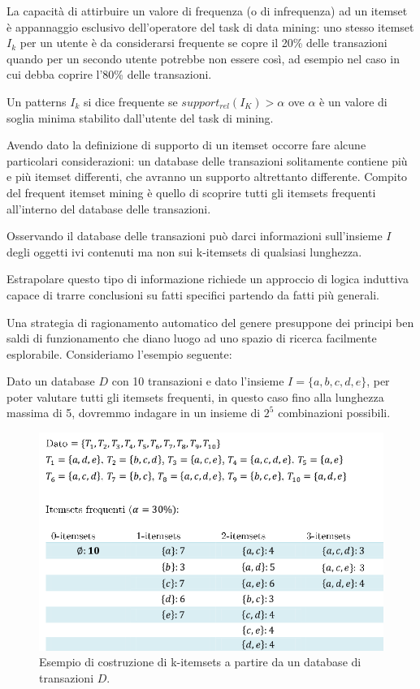 La capacit{\`a} di attirbuire un valore di frequenza (o di infrequenza) ad un itemset {\`e} appannaggio esclusivo dell'operatore del task di data mining: uno stesso itemset \( I_k \) per un utente {\`e} da considerarsi frequente se copre il 20\% delle transazioni quando per un secondo utente potrebbe non essere cos{\`i}, ad esempio nel caso in cui debba coprire l'80\% delle transazioni. 

\begin{defn}
Un patterns \( I_k \) si dice frequente se $support_{rel}(I_K) > \alpha$ ove $\alpha$ {\`e} un valore di soglia minima stabilito dall'utente del task di mining.
\end{defn}

Avendo dato la definizione di supporto di un itemset occorre fare alcune particolari considerazioni: un database delle transazioni solitamente contiene pi{\`u} e pi{\`u} itemset differenti, che avranno un supporto altrettanto differente. Compito del frequent itemset mining {\`e} quello di scoprire tutti gli itemsets frequenti all'interno del database delle transazioni. 

Osservando il database delle transazioni pu{\`o} darci informazioni sull'insieme \( I \) degli oggetti ivi contenuti ma non sui k-itemsets di qualsiasi lunghezza.

Estrapolare questo tipo di informazione richiede un approccio di logica induttiva capace di trarre conclusioni su fatti specifici partendo da fatti pi{\`u} generali. 

Una strategia di ragionamento automatico del genere presuppone dei principi ben saldi di funzionamento che diano luogo ad uno spazio di ricerca facilmente esplorabile. Consideriamo l'esempio seguente: 

Dato un database \( D \) con 10 transazioni e dato l'insieme \( I = \lbrace a,b,c,d,e \rbrace \), per poter valutare tutti gli itemsets frequenti, in questo caso fino alla lunghezza massima di 5, dovremmo indagare in un insieme di $2^5$ combinazioni possibili.

\begin{figure}\centering
\includegraphics[scale=0.50]{img/itemsets}
\caption{Esempio di costruzione di k-itemsets a partire da un database di transazioni \( D \).}
\end{figure}

